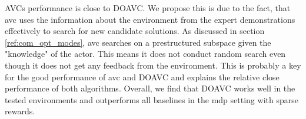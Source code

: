 AVCs performance is close to DOAVC. We propose this is due to the fact, that \ac{avc} uses the information about the environment 
from the expert demonstrations effectively to search for new candidate solutions. As discussed in section \ref{ref:com_opt_modes}, \ac{avc} searches on a prestructured subspace given the "knowledge" of the 
actor. This means it does not conduct random search even though it does not get any feedback from the environment. This is probably a key for the good performance of \ac{avc} and DOAVC and explains 
the relative close performance of both algorithms. Overall, we find that DOAVC works well in the tested environments and outperforms all baselines in the \ac{mdp} setting with sparse rewards.